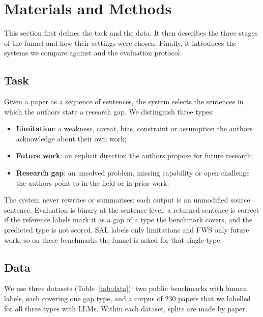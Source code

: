 \section{Materials and Methods}
\label{sec:methods}

This section first defines the task and the data. It then describes the three stages of the funnel and how their settings were chosen. Finally, it introduces the systems we compare against and the evaluation protocol.

\subsection{Task}

Given a paper as a sequence of sentences, the system selects the sentences in which the authors state a research gap. We distinguish three types:
\begin{itemize}
  \item \textbf{Limitation}: a weakness, caveat, bias, constraint or assumption the authors acknowledge about their own work;
  \item \textbf{Future work}: an explicit direction the authors propose for future research;
  \item \textbf{Research gap}: an unsolved problem, missing capability or open challenge the authors point to in the field or in prior work.
\end{itemize}
The system never rewrites or summarises; each output is an unmodified source sentence. Evaluation is binary at the sentence level: a returned sentence is correct if the reference labels mark it as a gap of a type the benchmark covers, and the predicted type is not scored. SAL labels only limitations and FWS only future work, so on these benchmarks the funnel is asked for that single type.

\subsection{Data}

We use three datasets (Table~\ref{tab:data}): two public benchmarks with human labels, each covering one gap type, and a corpus of 230 papers that we labelled for all three types with LLMs. Within each dataset, splits are made by paper.

